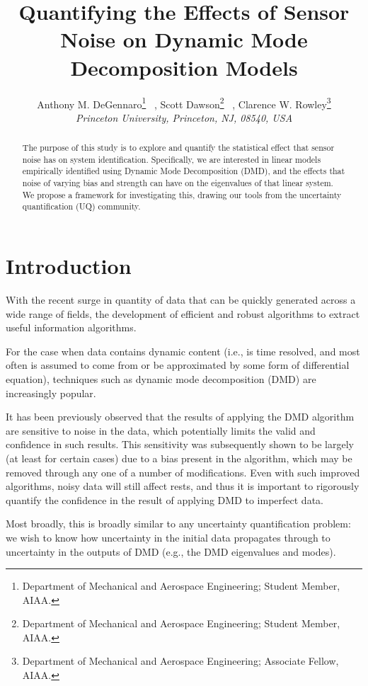 \documentclass{aiaa-tc}%
\title{Quantifying the Effects of Sensor Noise on Dynamic Mode Decomposition Models}
\author{%
  Anthony M. DeGennaro\thanks{Department of Mechanical and Aerospace
    Engineering; Student Member, AIAA.}
  \ ,
  Scott Dawson\thanks{Department of Mechanical and Aerospace
    Engineering; Student Member, AIAA.}
  \ ,
  Clarence W. Rowley\thanks{Department of Mechanical and Aerospace Engineering;
    Associate Fellow, AIAA.}\\
  {\normalsize\itshape
   Princeton University, Princeton, NJ, 08540, USA}\\
 }
\begin{document}
\maketitle

\begin{abstract}
  The purpose of this study is to explore and quantify the statistical
  effect that sensor noise has on system identification. Specifically,
  we are interested in linear models empirically identified using
  Dynamic Mode Decomposition (DMD), and the effects that noise of
  varying bias and strength can have on the eigenvalues of that linear
  system. We propose a framework for investigating this, drawing our
  tools from the uncertainty quantification (UQ) community.

\end{abstract}

\section{Introduction}

With the recent surge in quantity of data that can be quickly generated
across a wide range of fields, the development of efficient and robust algorithms to extract useful information algorithms.

For the case when data contains dynamic content (i.e., is time resolved, and most often is assumed to come from or be approximated by some form of differential equation), techniques such as dynamic mode decomposition (DMD)\cite{} are increasingly popular. 

It has been previously observed that the results of applying the DMD algorithm are sensitive to noise in the data\cite{}, which potentially limits the valid and confidence in such results. This sensitivity was subsequently shown to be largely (at least for certain cases) due to a bias present in the algorithm, which may be removed through any one of a number of modifications\cite{}.
Even with such improved algorithms, noisy data will still affect rests, and thus it is important to rigorously quantify the confidence in the result of applying DMD to imperfect data. 

Most broadly, this is broadly similar to any uncertainty quantification problem: we wish to know how uncertainty in the initial data propagates through to uncertainty in the outputs of DMD (e.g., the DMD eigenvalues and modes).




\end{document}
